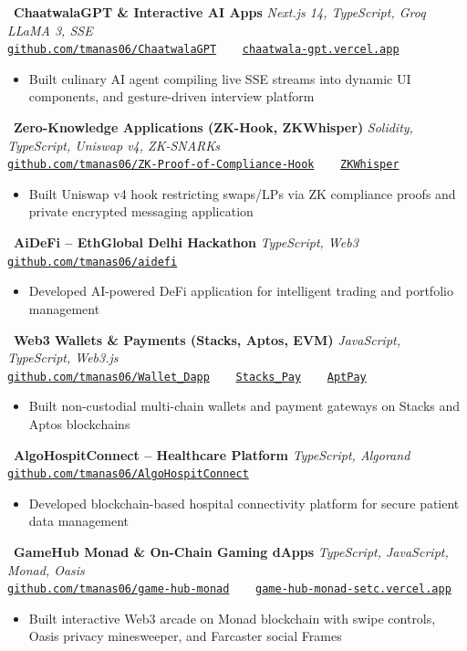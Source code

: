 \documentclass[11pt,a4paper]{article}
\newcommand{\projectentry}[4]{%
  \noindent
  \faGithub\ \textbf{#1} \hfill \textit{#2} \\
  {\small\texttt{#3}}
  \begin{itemize}[leftmargin=1.5em, itemsep=0.5pt, parsep=0pt, topsep=1pt]
    #4
  \end{itemize}
  \vspace{1.5pt}
}
\begin{document}
\projectentry{ChaatwalaGPT \& Interactive AI Apps}%
  {Next.js 14, TypeScript, Groq LLaMA 3, SSE}%
  {\href{https://github.com/tmanas06/ChaatwalaGPT}{github.com/tmanas06/ChaatwalaGPT} \ \textbar\ \ \href{https://chaatwala-gpt.vercel.app}{chaatwala-gpt.vercel.app}}%
  {\item Built culinary AI agent compiling live SSE streams into dynamic UI components, and gesture-driven interview platform}

\projectentry{Zero-Knowledge Applications (ZK-Hook, ZKWhisper)}%
  {Solidity, TypeScript, Uniswap v4, ZK-SNARKs}%
  {\href{https://github.com/tmanas06/ZK-Proof-of-Compliance-Hook}{github.com/tmanas06/ZK-Proof-of-Compliance-Hook} \ \textbar\ \ \href{https://github.com/tmanas06/ZKWhisper}{ZKWhisper}}%
  {\item Built Uniswap v4 hook restricting swaps/LPs via ZK compliance proofs and private encrypted messaging application}

\projectentry{AiDeFi -- EthGlobal Delhi Hackathon}%
  {TypeScript, Web3}%
  {\href{https://github.com/tmanas06/aidefi}{github.com/tmanas06/aidefi}}%
  {\item Developed AI-powered DeFi application for intelligent trading and portfolio management}

\projectentry{Web3 Wallets \& Payments (Stacks, Aptos, EVM)}%
  {JavaScript, TypeScript, Web3.js}%
  {\href{https://github.com/tmanas06/Wallet_Dapp}{github.com/tmanas06/Wallet\_Dapp} \ \textbar\ \ \href{https://github.com/tmanas06/Stacks_Pay}{Stacks\_Pay} \ \textbar\ \ \href{https://github.com/tmanas06/AptPay}{AptPay}}%
  {\item Built non-custodial multi-chain wallets and payment gateways on Stacks and Aptos blockchains}

\projectentry{AlgoHospitConnect -- Healthcare Platform}%
  {TypeScript, Algorand}%
  {\href{https://github.com/tmanas06/AlgoHospitConnect}{github.com/tmanas06/AlgoHospitConnect}}%
  {\item Developed blockchain-based hospital connectivity platform for secure patient data management}

\projectentry{GameHub Monad \& On-Chain Gaming dApps}%
  {TypeScript, JavaScript, Monad, Oasis}%
  {\href{https://github.com/tmanas06/game-hub-monad}{github.com/tmanas06/game-hub-monad} \ \textbar\ \ \href{https://game-hub-monad-setc.vercel.app/game}{game-hub-monad-setc.vercel.app}}%
  {\item Built interactive Web3 arcade on Monad blockchain with swipe controls, Oasis privacy minesweeper, and Farcaster social Frames}
\end{document}
